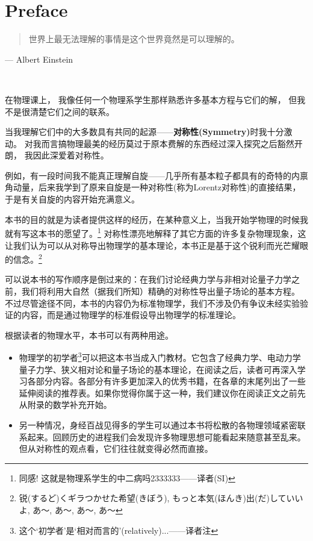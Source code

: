 
\chapter*{Preface}

\begin{quote}
世界上最无法理解的事情是这个世界竟然是可以理解的。
\end{quote}
\begin{flushright}
--- Albert Einstein
\end{flushright}


\ 

在物理课上， 我像任何一个物理系学生那样熟悉许多基本方程与它们的解， 但我不是很清楚它们之间的联系。

当我理解它们中的大多数具有共同的起源——\textbf{对称性(Symmetry)}时我十分激动。 对我而言搞物理最美的经历莫过于原本费解的东西经过深入探究之后豁然开朗， 我因此深爱着对称性。

例如，有一段时间我不能真正理解自旋——几乎所有基本粒子都具有的奇特的内禀角动量，后来我学到了原来自旋是一种对称性(称为Lorentz对称性)的直接结果，于是有关自旋的内容开始充满意义。

本书的目的就是为读者提供这样的经历，在某种意义上，当我开始学物理的时候我就有写这本书的愿望了。\footnote{同感! 这就是物理系学生的中二病吗2333333——译者(SI)} 对称性漂亮地解释了其它方面的许多复杂物理现象，这让我们认为可以从对称导出物理学的基本理论，本书正是基于这个锐利而光芒耀眼的信念。\footnote{锐(するど)くギラつかせた希望(きぼう), もっと本気(ほんき)出(だ)していいよ, あ～, あ～, あ～, あ～}

可以说本书的写作顺序是倒过来的：在我们讨论经典力学与非相对论量子力学之前，我们将利用大自然（据我们所知）精确的对称性导出量子场论的基本方程。 不过尽管途径不同，本书的内容仍为标准物理学，我们不涉及仍有争议未经实验验证的内容，而是通过物理学的标准假设导出物理学的标准理论。

根据读者的物理水平，本书可以有两种用途。
\begin{itemize}
	\item 物理学的初学者\footnote{这个`初学者'是`相对而言的'(relatively)...——译者注}可以把这本书当成入门教材。它包含了经典力学、电动力学量子力学、狭义相对论和量子场论的基本理论，在阅读之后，读者可再深入学习各部分内容。各部分有许多更加深入的优秀书籍，在各章的末尾列出了一些延伸阅读的推荐表。如果你觉得你属于这一种，我们建议你在阅读正文之前先从附录的数学补充开始。
	\item 
	另一种情况，身经百战见得多的学生可以通过本书将松散的各物理领域紧密联系起来。回顾历史的进程我们会发现许多物理思想可能看起来随意甚至乱来。但从对称性的观点看，它们往往就变得必然而直接。
\end{itemize}

